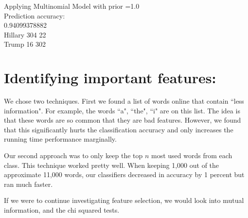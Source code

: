 \documentclass[]{article}
\begin{document}
Applying Multinomial Model with prior =1.0\\
Prediction accuracy:\\
0.94099378882\\
Hillary     304 22 \\
Trump       16  302

\section{Identifying important features:}

We chose two techniques. First we found a list of words online that contain ``less information". For example, the words ``a", ``the", ``i" are on this list. The idea is that these words are so common that they are bad features. However, we found that this significantly hurts the classification accuracy and only increases the running time performance marginally. 

Our second approach was to only keep the top $n$ most used words from each class. This technique worked pretty well. When keeping 1,000 out of the approximate 11,000 words, our classifiers decreased in accuracy by 1 percent but ran much faster. 

If we were to continue investigating feature selection, we would look into mutual information, and the chi squared tests. 
\end{document}
